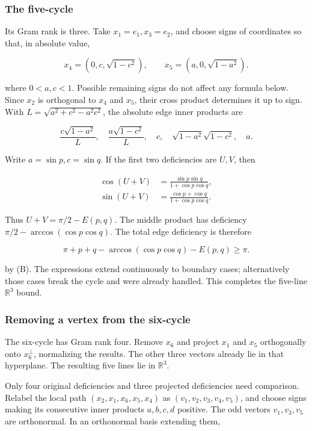 \documentclass[11pt,a4paper]{article}
\begin{document}
\subsubsection{The five-cycle}\label{the-five-cycle}

Its Gram rank is three. Take \(x_1=e_1,x_3=e_2\), and choose signs of coordinates so that, in absolute value,

\[
x_4=(0,c,\sqrt{1-c^2}),\qquad x_5=(a,0,\sqrt{1-a^2}).
\]

where \(0<a,c<1\). Possible remaining signs do not affect any formula below. Since \(x_2\) is orthogonal to \(x_4\) and \(x_5\), their cross product determines it up to sign. With \(L=\sqrt{a^2+c^2-a^2c^2}\), the absolute edge inner products are

\[
\frac{c\sqrt{1-a^2}}{L},\quad\frac{a\sqrt{1-c^2}}{L},\quad c,\quad\sqrt{1-a^2}\sqrt{1-c^2},\quad a.
\]

Write \(a=\sin p,c=\sin q\). If the first two deficiencies are \(U,V\), then

\[
\begin{aligned}\cos(U+V)&=\frac{\sin p\sin q}{1+\cos p\cos q},\\\sin(U+V)&=\frac{\cos p+\cos q}{1+\cos p\cos q}.\end{aligned}
\]

Thus \(U+V=\pi/2-E(p,q)\). The middle product has deficiency \(\pi/2-\arccos(\cos p\cos q)\). The total edge deficiency is therefore

\[
\pi+p+q-\arccos(\cos p\cos q)-E(p,q)\ge\pi.
\]

by (B). The expressions extend continuously to boundary cases; alternatively those cases break the cycle and were already handled. This completes the five-line \(\mathbb R^3\) bound.

\subsubsection{Removing a vertex from the six-cycle}\label{removing-a-vertex-from-the-six-cycle}

The six-cycle has Gram rank four. Remove \(x_6\) and project \(x_1\) and \(x_5\) orthogonally onto \(x_6^\perp\), normalizing the results. The other three vectors already lie in that hyperplane. The resulting five lines lie in \(\mathbb R^3\).

Only four original deficiencies and three projected deficiencies need comparison. Relabel the local path \((x_2,x_1,x_6,x_5,x_4)\) as \((v_1,v_2,v_3,v_4,v_5)\), and choose signs making its consecutive inner products \(a,b,c,d\) positive. The odd vectors \(v_1,v_3,v_5\) are orthonormal. In an orthonormal basis extending them,
\end{document}
